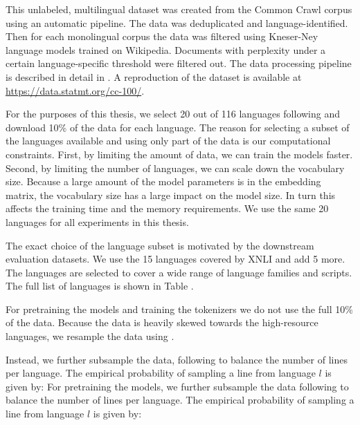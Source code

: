 This unlabeled, multilingual dataset was created from the Common Crawl corpus using an automatic pipeline. The data was deduplicated and language-identified. Then for each monolingual corpus the data was filtered using Kneser-Ney language models trained on Wikipedia. Documents with perplexity under a certain language-specific threshold were filtered out. The data processing pipeline is described in detail in \citet{wenzek_ccnet_nodate}. A reproduction of the dataset is available at \url{https://data.statmt.org/cc-100/}.

For the purposes of this thesis, we select 20 out of 116 languages following \citet{limisiewicz_tokenization_2023} and download 10\% of the data for each language. The reason for selecting a subset of the languages available and using only part of the data is our computational constraints. First, by limiting the amount of data, we can train the models faster. Second, by limiting the number of languages, we can scale down the vocabulary size. Because a large amount of the model parameters is in the embedding matrix, the vocabulary size has a large impact on the model size. In turn this affects the training time and the memory requirements. We use the same 20 languages for all experiments in this thesis.

The exact choice of the language subset is motivated by the downstream evaluation datasets. We use the 15 languages covered by XNLI and add 5 more. The languages are selected to cover a wide range of language families and scripts. The full list of languages is shown in Table .



For pretraining the models and training the tokenizers we do not use the full 10\% of the data. Because the data is heavily skewed towards the high-resource languages, we resample the data using . 

Instead, we further subsample the data, following \citet{conneau_unsupervised_2020-1} to balance the number of lines per language. The empirical probability of sampling a line from language $l$ is given by:
For pretraining the models, we further subsample the data following \citet{conneau_unsupervised_2020-1} to balance the number of lines per language. The empirical probability of sampling a line from language $l$ is given by:

